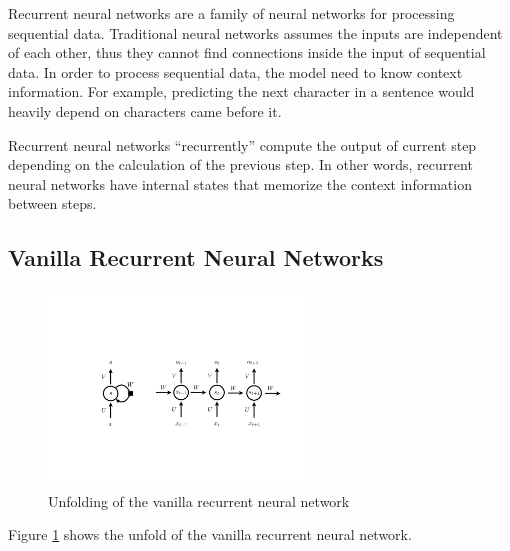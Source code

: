     Recurrent neural networks are a family of neural networks for processing sequential data.
    Traditional neural networks assumes the inputs are independent of each other,
    thus they cannot find connections inside the input of sequential data.
    In order to process sequential data, the model need to know context information.
    For example, predicting the next character in a sentence would heavily depend on
    characters came before it.

    Recurrent neural networks ``recurrently'' compute the output of current step
    depending on the calculation of the previous step.
    In other words, recurrent neural networks have internal states
    that memorize the context information between steps.

    \subsection{Vanilla Recurrent Neural Networks}

        \begin{figure}[!htp]
            \centering
            \includegraphics[width=0.62\textwidth]{img/rnn.pdf}
            \caption{Unfolding of the vanilla recurrent neural network}
            \label{fig:rnn}
        \end{figure}

        Figure \ref{fig:rnn} shows the unfold of the vanilla recurrent neural network.


